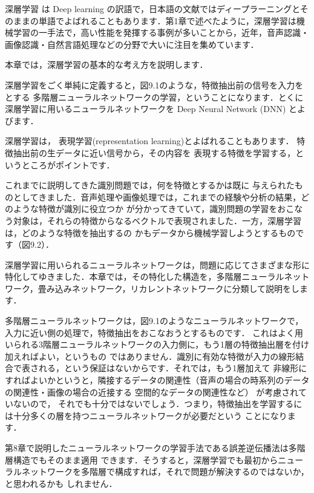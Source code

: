
深層学習
は
Deep learning
の訳語で，日本語の文献ではディープラーニングとそのままの単語でよばれることもあります．第1章で述べたように，深層学習は機械学習の一手法で，高い性能を発揮する事例が多いことから，近年，音声認識・画像認識・自然言語処理などの分野で大いに注目を集めています．

本章では，深層学習の基本的な考え方を説明します．

深層学習をごく単純に定義すると，図9.1のような，特徴抽出前の信号を入力をとする
多階層ニューラルネットワークの学習，ということになります．とくに深層学習に用いるニューラルネットワークを
Deep Neural Network (DNN) 
とよびます．

深層学習は，
表現学習(representation learning)とよばれることもあります．
特徴抽出前の生データに近い信号から，その内容を
表現する特徴を学習する，というところがポイントです．


これまでに説明してきた識別問題では，何を特徴とするかは既に
与えられたものとしてきました．音声処理や画像処理では，これまでの経験や分析の結果，どのような特徴が識別に役立つか
が分かってきていて，識別問題の学習をおこなう対象は，それらの特徴からなるベクトルで表現されました．一方，深層学習は，どのような特徴を抽出するの
かもデータから機械学習しようとするものです（図9.2）．


深層学習に用いられるニューラルネットワークは，問題に応じてさまざまな形に特化してゆきました．本章では，その特化した構造を，多階層ニューラルネットワーク，畳み込みネットワーク，リカレントネットワークに分類して説明をします．


多階層ニューラルネットワークは，図9.1のようなニューラルネットワークで，入力に近い側の処理で，特徴抽出をおこなおうとするものです．
これはよく用いられる3階層ニューラルネットワークの入力側に，もう1層の特徴抽出層を付け加えればよい，というもの
ではありません．識別に有効な特徴が入力の線形結合で表される，という保証はないからです．それでは，もう1層加えて
非線形にすればよいかというと，隣接するデータの関連性（音声の場合の時系列のデータの関連性・画像の場合の近接する
空間的なデータの関連性など）
が考慮されていないので，
それでも十分ではないでしょう．つまり，特徴抽出を学習するには十分多くの層を持つニューラルネットワークが必要だという
ことになります．

第8章で説明したニューラルネットワークの学習手法である誤差逆伝播法は多階層構造でもそのまま適用
できます．そうすると，深層学習でも最初からニューラルネットワークを多階層で構成すれば，それで問題が解決するのではないか，と思われるかも
しれません．


